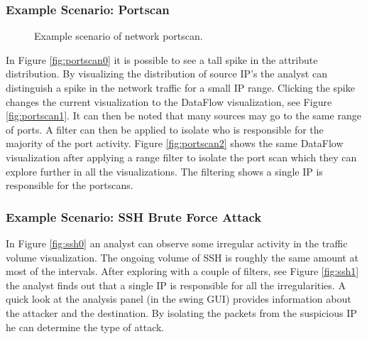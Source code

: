 \subsubsection{Example Scenario: Portscan}
\begin{figure}[htb]
	\centering
	\caption{\label{fig:portscan} Example scenario of network portscan.}
\end{figure}

In Figure \ref{fig:portscan0} it is possible to see a tall spike in the attribute distribution. By
visualizing the distribution of source IP's the analyst can distinguish a spike in the network
traffic for a small IP range. Clicking the spike changes the current visualization to the DataFlow
visualization, see Figure \ref{fig:portscan1}. It can then be noted that many sources may go to the
same range of ports. A filter can then be applied to isolate who is responsible for the majority
of the port activity. Figure \ref{fig:portscan2} shows the same DataFlow visualization after
applying a range filter to isolate the port scan which they can explore further in all the
visualizations. The filtering shows a single IP is responsible for the portscans.

\subsubsection{Example Scenario: SSH Brute Force Attack}
In Figure \ref{fig:ssh0} an analyst can observe some irregular activity in the traffic volume
visualization. The ongoing volume of SSH is roughly the same amount at most of the intervals. After
exploring with a couple of filters, see Figure \ref{fig:ssh1} the analyst finds out that a single IP
is responsible for all the irregularities. A quick look at the analysis panel (in the swing GUI)
provides information about the attacker and the destination. By isolating the packets from the
suspicious IP he can determine the type of attack. 

